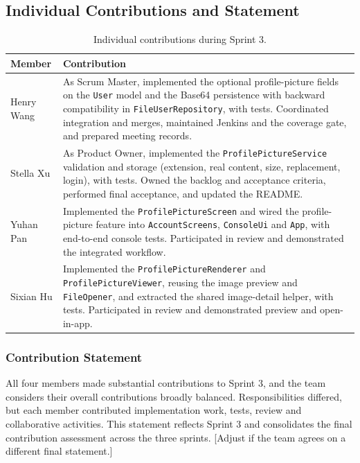 \documentclass[a4paper,11pt]{article}
\renewcommand{\arraystretch}{1.5}
\begin{document}
\subsection{Individual Contributions and Statement}

\begin{table}[H]
    \centering
    \small
    \renewcommand{\arraystretch}{1.2}
    \begin{tabularx}{\textwidth}{|>{\raggedright\arraybackslash}p{}|>{\raggedright\arraybackslash}X|}
        \hline
        \textbf{Member} & \textbf{Contribution} \\
        \hline
        Henry Wang & As Scrum Master, implemented the optional profile-picture fields on the \texttt{User} model and the Base64 persistence with backward compatibility in \texttt{FileUserRepository}, with tests. Coordinated integration and merges, maintained Jenkins and the coverage gate, and prepared meeting records. \\
        \hline
        Stella Xu & As Product Owner, implemented the \texttt{ProfilePictureService} validation and storage (extension, real content, size, replacement, login), with tests. Owned the backlog and acceptance criteria, performed final acceptance, and updated the README. \\
        \hline
        Yuhan Pan & Implemented the \texttt{ProfilePictureScreen} and wired the profile-picture feature into \texttt{AccountScreens}, \texttt{ConsoleUi} and \texttt{App}, with end-to-end console tests. Participated in review and demonstrated the integrated workflow. \\
        \hline
        Sixian Hu & Implemented the \texttt{ProfilePictureRenderer} and \texttt{ProfilePictureViewer}, reusing the image preview and \texttt{FileOpener}, and extracted the shared image-detail helper, with tests. Participated in review and demonstrated preview and open-in-app. \\
        \hline
    \end{tabularx}
    \caption{Individual contributions during Sprint 3.}
    \label{tab:sprint3-contributions}
\end{table}

\subsubsection*{Contribution Statement}
All four members made substantial contributions to Sprint 3, and the team considers their overall contributions broadly balanced. Responsibilities differed, but each member contributed implementation work, tests, review and collaborative activities. This statement reflects Sprint 3 and consolidates the final contribution assessment across the three sprints. [Adjust if the team agrees on a different final statement.]
\end{document}

